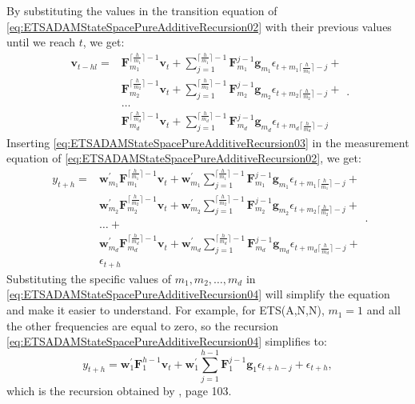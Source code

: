 \documentclass[
]{book}
\theoremstyle{definition}
\theoremstyle{definition}
\theoremstyle{definition}
\theoremstyle{definition}
\theoremstyle{remark}
\begin{document}
By substituting the values in the transition equation of \eqref{eq:ETSADAMStateSpacePureAdditiveRecursion02} with their previous values until we reach \(t\), we get:
\begin{equation}
  \begin{aligned}
    \mathbf{v}_{t-h{l}} = & \mathbf{F}_{m_1}^{\lceil\frac{h}{m_1}\rceil-1} \mathbf{v}_{t} + \sum_{j=1}^{\lceil\frac{h}{m_1}\rceil-1} \mathbf{F}_{m_1}^{j-1} \mathbf{g}_{m_1} \epsilon_{t+m_1\lceil\frac{h}{m_1}\rceil-j} + \\
    & \mathbf{F}_{m_2}^{\lceil\frac{h}{m_2}\rceil-1} \mathbf{v}_{t} + \sum_{j=1}^{\lceil\frac{h}{m_2}\rceil-1} \mathbf{F}_{m_2}^{j-1} \mathbf{g}_{m_2} \epsilon_{t+m_2\lceil\frac{h}{m_2}\rceil-j} + \\
    & \dots \\
    & \mathbf{F}_{m_d}^{\lceil\frac{h}{m_d}\rceil-1} \mathbf{v}_{t} + \sum_{j=1}^{\lceil\frac{h}{m_d}\rceil-1} \mathbf{F}_{m_d}^{j-1} \mathbf{g}_{m_d} \epsilon_{t+m_d\lceil\frac{h}{m_d}\rceil-j}
  \end{aligned}.
  \label{eq:ETSADAMStateSpacePureAdditiveRecursion03}
\end{equation}
Inserting \eqref{eq:ETSADAMStateSpacePureAdditiveRecursion03} in the measurement equation of \eqref{eq:ETSADAMStateSpacePureAdditiveRecursion02}, we get:
\begin{equation}
  \begin{aligned}
    y_{t+h} = & \mathbf{w}_{m_1}^\prime \mathbf{F}_{m_1}^{\lceil\frac{h}{m_1}\rceil-1} \mathbf{v}_{t} + \mathbf{w}_{m_1}^\prime \sum_{j=1}^{\lceil\frac{h}{m_1}\rceil-1} \mathbf{F}_{m_1}^{j-1} \mathbf{g}_{m_1} \epsilon_{t+m_1\lceil\frac{h}{m_1}\rceil-j} + \\
    & \mathbf{w}_{m_2}^\prime \mathbf{F}_{m_2}^{\lceil\frac{h}{m_2}\rceil-1} \mathbf{v}_{t} + \mathbf{w}_{m_2}^\prime \sum_{j=1}^{\lceil\frac{h}{m_2}\rceil-1} \mathbf{F}_{m_2}^{j-1} \mathbf{g}_{m_2} \epsilon_{t+m_2\lceil\frac{h}{m_2}\rceil-j} + \\
    & \dots + \\
    & \mathbf{w}_{m_d}^\prime \mathbf{F}_{m_d}^{\lceil\frac{h}{m_d}\rceil-1} \mathbf{v}_{t} + \mathbf{w}_{m_d}^\prime \sum_{j=1}^{\lceil\frac{h}{m_d}\rceil-1} \mathbf{F}_{m_d}^{j-1} \mathbf{g}_{m_d} \epsilon_{t+m_d\lceil\frac{h}{m_d}\rceil-j} + \\
    & \epsilon_{t+h}
  \end{aligned}.
  \label{eq:ETSADAMStateSpacePureAdditiveRecursion04}
\end{equation}
Substituting the specific values of \(m_1, m_2, \dots, m_d\) in \eqref{eq:ETSADAMStateSpacePureAdditiveRecursion04} will simplify the equation and make it easier to understand. For example, for ETS(A,N,N), \(m_1=1\) and all the other frequencies are equal to zero, so the recursion \eqref{eq:ETSADAMStateSpacePureAdditiveRecursion04} simplifies to:
\begin{equation}
    y_{t+h} = \mathbf{w}_{1}^\prime \mathbf{F}_{1}^{h-1} \mathbf{v}_{t} + \mathbf{w}_{1}^\prime \sum_{j=1}^{h-1} \mathbf{F}_{1}^{j-1} \mathbf{g}_{1} \epsilon_{t+h-j} + \epsilon_{t+h} ,
  \label{eq:ETSADAMStateSpacePureAdditiveRecursion06}
\end{equation}
which is the recursion obtained by \citet{Hyndman2008b}, page 103.
\end{document}
